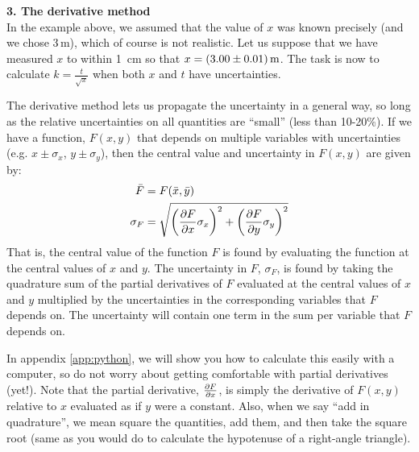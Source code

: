 \textbf{3. The derivative method}\\
In the example above, we assumed that the value of $x$ was known precisely (and we chose 3\,m), which of course is not realistic. Let us suppose that we have measured $x$ to within \SI{1}{cm} so that $x=\SI{3.00 \pm 0.01}{m}$. The task is now to calculate $k=\frac{t}{\sqrt{x}}$ when both $x$ and $t$ have uncertainties.

The derivative method lets us propagate the uncertainty in a general way, so long as the relative uncertainties on all quantities are ``small'' (less than 10-20\%). If we have a function, $F(x,y)$ that depends on multiple variables with uncertainties (e.g. $x\pm\sigma_x$, $y\pm\sigma_y$), then the central value and uncertainty in $F(x,y)$ are given by:
\begin{align}
\bar F &= F(\bar x, \bar y) \nonumber \\
\sigma_F &= \sqrt{\left(\frac{\partial F}{\partial x}\sigma_x \right)^2 + \left(\frac{\partial F}{\partial y}\sigma_y \right)^2 }
\end{align}
That is, the central value of the function $F$ is found by evaluating the function at the central values of $x$ and $y$. The uncertainty in $F$, $\sigma_F$, is found by taking the quadrature sum of the partial derivatives of $F$ evaluated at the central values of $x$ and $y$ multiplied by the uncertainties in the corresponding variables that $F$ depends on. The uncertainty will contain one term in the sum per variable that $F$ depends on.

In appendix \ref{app:python}, we will show you how to calculate this easily with a computer, so do not worry about getting comfortable with partial derivatives (yet!). Note that the partial derivative, $\frac{\partial F}{\partial x}$, is simply the derivative of $F(x,y)$ relative to $x$ evaluated as if $y$ were a constant. Also, when we say ``add in quadrature'', we mean square the quantities, add them, and then take the square root (same as you would do to calculate the hypotenuse of a right-angle triangle).

